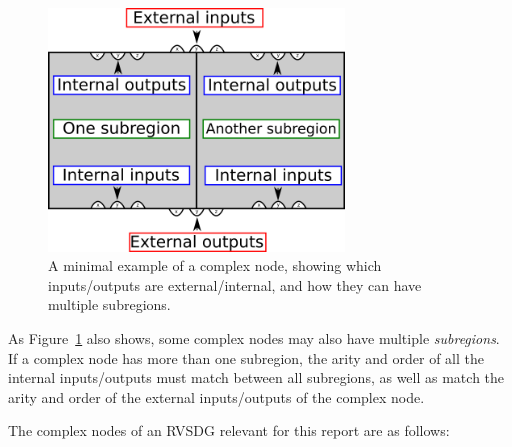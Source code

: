 \begin{figure}[H]
	\centering
	\includegraphics[width=0.7\textwidth]{figures/complex_node_mapping_ex}
	\caption{A minimal example of a complex node, showing which inputs/outputs
are external/internal, and how they can have multiple subregions.}
	\label{fig:complex_node_mapping_ex}
\end{figure}


As Figure~\ref{fig:complex_node_mapping_ex} also shows, some complex nodes may
also have multiple \textit{subregions}. If a complex node has more than one
subregion, the arity and order of all the internal inputs/outputs must match
between all subregions, as well as match the arity and order of the external
inputs/outputs of the complex node.

The complex nodes of an RVSDG relevant for this report are as follows:


